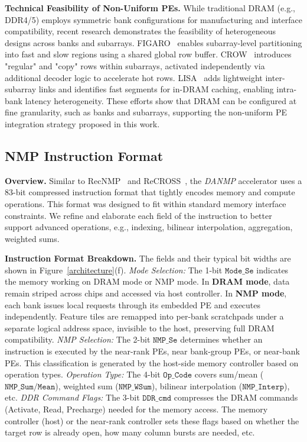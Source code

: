 \documentclass[sigconf]{acmart}
\begin{document}
{{\bf Technical Feasibility of Non-Uniform PEs.} While traditional DRAM (e.g., DDR4/5) employs symmetric bank configurations for manufacturing and interface compatibility, recent research demonstrates the feasibility of heterogeneous designs across banks and subarrays. FIGARO~\cite{wang2020figaro} enables subarray-level partitioning into fast and slow regions using a shared global row buffer. CROW~\cite{hassan2019crow} introduces "regular" and "copy" rows within subarrays, activated independently via additional decoder logic to accelerate hot rows. LISA~\cite{chang2016low} adds lightweight inter-subarray links and identifies fast segments for in-DRAM caching, enabling intra-bank latency heterogeneity. These efforts show that DRAM can be configured at fine granularity, such as banks and subarrays, supporting the non-uniform PE integration strategy proposed in this work.}



\subsection{NMP Instruction Format}
\label{instruct}
{\bf Overview.} {Similar to RecNMP~\cite{recnmp2020} and ReCROSS~\cite{Liu2023},} the \textit{DANMP} accelerator uses a 83-bit compressed instruction format that tightly encodes memory and compute operations. This format was designed to fit within standard memory interface constraints. We refine and elaborate each field of the instruction to better support advanced operations, e.g., indexing, bilinear interpolation, aggregation, weighted sums.

{\bf Instruction Format Breakdown.} The fields and their typical bit widths are shown in Figure~\ref{architecture}(f). \textit{Mode Selection:} The 1-bit $\mathtt{Mode\_Se}$ indicates the memory working on DRAM mode or NMP mode. {In \textbf{DRAM mode}, data remain striped across chips and accessed via host controller. In \textbf{NMP mode}, each bank issues local requests through its embedded PE and executes independently. Feature tiles are remapped into per-bank scratchpads under a separate logical address space, invisible to the host, preserving full DRAM compatibility.} {\textit{NMP Selection:} The 2-bit $\mathtt{NMP\_Se}$ determines whether an instruction is executed by the near-rank PEs, near bank-group PEs, or near-bank PEs. This classification is generated by the host-side memory controller based on operation types.} \textit{Operation Type:} The 4-bit $\mathtt{Op\_Code}$ covers sum/mean ($\mathtt{NMP\_Sum/Mean}$), weighted sum ($\mathtt{NMP\_WSum}$), bilinear interpolation ($\mathtt{NMP\_Interp}$), etc. \textit{DDR Command Flags:} The 3-bit $\mathtt{DDR\_cmd}$ compresses the DRAM commands (Activate, Read, Precharge) needed for the memory access. The memory controller (host) or the near-rank controller sets these flags based on whether the target row is already open, how many column bursts are needed, etc. 
\end{document}
